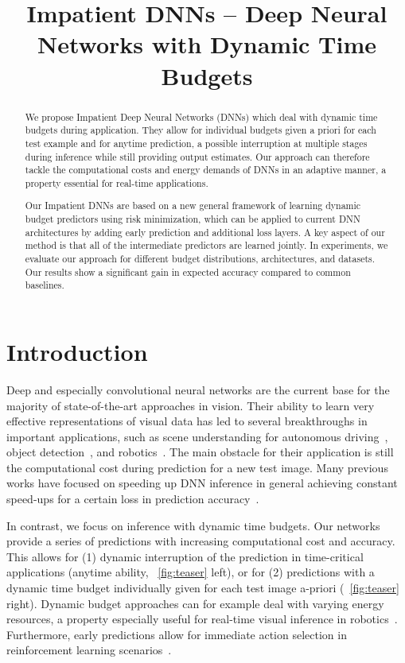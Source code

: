 \documentclass{bmvc2k}
\title{Impatient DNNs -- Deep Neural Networks with Dynamic Time Budgets}
\begin{document}
\maketitle

\begin{abstract}
    We propose Impatient Deep Neural Networks (DNNs) which deal with
    dynamic time budgets during application. They allow for individual budgets given
    a priori for each test example and for anytime prediction, \ie a possible interruption at multiple
    stages during inference while still providing output estimates.
    Our approach can therefore tackle the computational costs and energy demands
    of DNNs in an adaptive manner, a property essential for real-time applications.

    Our Impatient DNNs are based on a new general framework of learning dynamic budget predictors
    using risk minimization, which can be applied to current DNN architectures
    by adding early prediction and additional loss layers. A key aspect of our method is that
    all of the intermediate predictors are learned jointly.
    In experiments, we evaluate our approach for different budget distributions,
    architectures, and datasets. Our results show a significant gain in expected accuracy compared
    to common baselines.
\end{abstract}

\section{Introduction}
\label{sec:intro}

Deep and especially convolutional neural networks are the current base for the majority
of state-of-the-art approaches in vision. Their ability to learn very
effective representations of visual data has led to several breakthroughs in important applications, such
as scene understanding for autonomous driving~\cite{cordts2016cityscapes}, object detection~\cite{girshick2014rich},
and robotics~\cite{finn2016deepspatial}.
The main obstacle for their application is still the computational cost
during prediction for a new test image. Many previous works have focused on speeding up DNN inference
in general achieving constant speed-ups for a certain loss in prediction accuracy~\cite{jaderberg2014speeding,lebedev2015fast}.

In contrast, we focus on inference with dynamic time budgets. Our networks provide a series of
predictions with increasing computational cost and accuracy. This allows for (1) dynamic interruption of the prediction
in time-critical applications (anytime ability, \figurename~\ref{fig:teaser} left), or for (2) predictions with a dynamic time budget individually given for each test image a-priori (\figurename~\ref{fig:teaser} right).
Dynamic budget approaches can for example deal with varying energy resources, a property especially useful for real-time visual inference
in robotics~\cite{levine2015end}. Furthermore, early predictions allow for immediate action selection in reinforcement learning scenarios~\cite{silver2013learning}.
\end{document}
